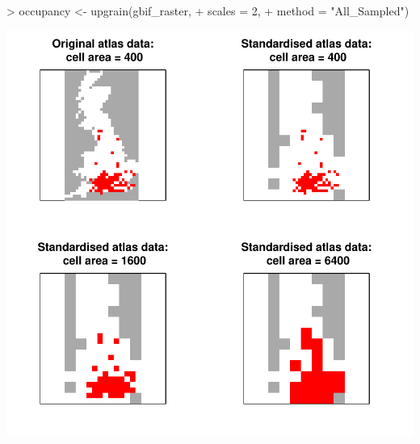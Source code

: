 \documentclass{article}[12pt, a4paper]
\begin{document}
\begin{Schunk}
\begin{Sinput}
> occupancy <- upgrain(gbif_raster,
+                      scales = 2,
+                      method = "All_Sampled")
\end{Sinput}
\end{Schunk}
\includegraphics{Downscaling-downscale41}
\end{document}
